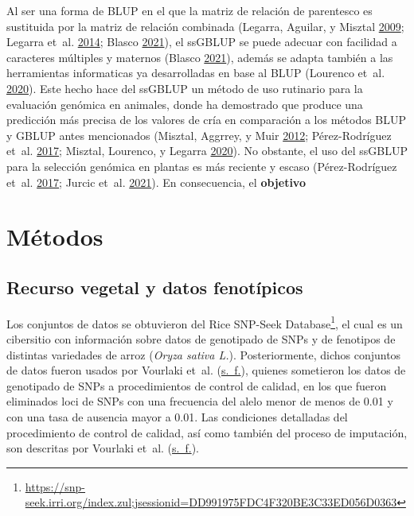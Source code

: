 \documentclass[11pt,spanish,a4paper,oneside,]{book} %
\renewcommand{\href}[2]{#2\footnote{\url{#1}}}
\let\rmarkdownfootnote\footnote%
\def\footnote{\protect\rmarkdownfootnote}
\begin{document}
Al ser una forma de BLUP en el que la matriz de relación de parentesco es sustituida por la matriz de relación combinada (Legarra, Aguilar, y Misztal \protect\hyperlink{ref-cite:17}{2009}; Legarra et~al. \protect\hyperlink{ref-cite:15}{2014}; Blasco \protect\hyperlink{ref-cite:21}{2021}), el ssGBLUP se puede adecuar con facilidad a caracteres múltiples y maternos (Blasco \protect\hyperlink{ref-cite:21}{2021}), además se adapta también a las herramientas informaticas ya desarrolladas en base al BLUP (Lourenco et~al. \protect\hyperlink{ref-cite:22}{2020}). Este hecho hace del ssGBLUP un método de uso rutinario para la evaluación genómica en animales, donde ha demostrado que produce una predicción más precisa de los valores de cría en comparación a los métodos BLUP y GBLUP antes mencionados (Misztal, Aggrrey, y Muir \protect\hyperlink{ref-cite:14}{2012}; Pérez-Rodríguez et~al. \protect\hyperlink{ref-cite:19}{2017}; Misztal, Lourenco, y Legarra \protect\hyperlink{ref-cite:18}{2020}). No obstante, el uso del ssGBLUP para la selección genómica en plantas es más reciente y escaso (Pérez-Rodríguez et~al. \protect\hyperlink{ref-cite:19}{2017}; Jurcic et~al. \protect\hyperlink{ref-cite:11}{2021}). En consecuencia, el \textbf{objetivo}

\hypertarget{methods2}{%
\section{Métodos}\label{methods2}}

\hypertarget{recurso-vegetal-y-datos-fenotuxedpicos}{%
\subsection{Recurso vegetal y datos fenotípicos}\label{recurso-vegetal-y-datos-fenotuxedpicos}}

Los conjuntos de datos se obtuvieron del \href{https://snp-seek.irri.org/index.zul;jsessionid=DD991975FDC4F320BE3C33ED056D0363}{Rice SNP-Seek Database}, el cual es un cibersitio con información sobre datos de genotipado de SNPs y de fenotipos de distintas variedades de arroz (\emph{Oryza sativa L.}). Posteriormente, dichos conjuntos de datos fueron usados por Vourlaki et~al. (\protect\hyperlink{ref-cite:26}{s.~f.}), quienes sometieron los datos de genotipado de SNPs a procedimientos de control de calidad, en los que fueron eliminados loci de SNPs con una frecuencia del alelo menor de menos de 0.01 y con una tasa de ausencia mayor a 0.01. Las condiciones detalladas del procedimiento de control de calidad, así como también del proceso de imputación, son descritas por Vourlaki et~al. (\protect\hyperlink{ref-cite:26}{s.~f.}).
\end{document}
